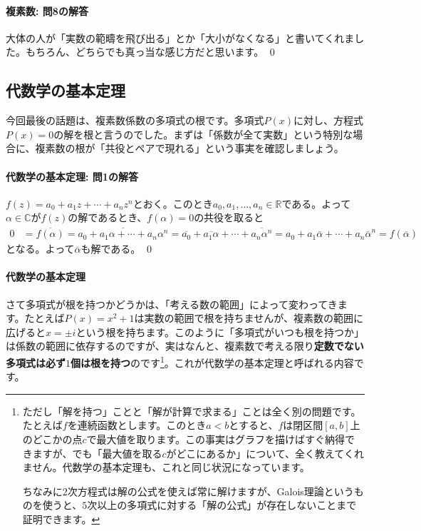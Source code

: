 \paragraph{複素数: 問8の解答}

大体の人が「実数の範疇を飛び出る」とか「大小がなくなる」と書いてくれました。もちろん、どちらでも真っ当な感じ方だと思います。 \qed

\subsection{代数学の基本定理}

今回最後の話題は、複素数係数の多項式の根です。多項式$P(x)$に対し、方程式$P(x)=0$の解を根と言うのでした。まずは「係数が全て実数」という特別な場合に、複素数の根が「共役とペアで現れる」という事実を確認しましょう。

\paragraph{代数学の基本定理: 問1の解答}

$f(z) = a_0 + a_1 z + \cdots + a_n z^n$とおく。このとき$a_0,a_1,\ldots,a_n\in\mathbb{R}$である。よって$\alpha\in\mathbb{C}$が$f(z)$の解であるとき、$f(\alpha)=0$の共役を取ると
\begin{align*}
0 &= \overline{f(\alpha)}
= \overline{a_0 + a_1 \alpha + \cdots + a_n \alpha^n}
= \overline{a_0} +\overline{a_1 \alpha} + \cdots + \overline{a_n \alpha^n}
= a_0 + a_1 \overline{\alpha} + \cdots + a_n \overline{\alpha}^n
= f(\overline{\alpha})
\end{align*}
となる。よって$\overline{\alpha}$も解である。 \qed

\paragraph{代数学の基本定理}

さて多項式が根を持つかどうかは、「考える数の範囲」によって変わってきます。たとえば$P(x)=x^2+1$は実数の範囲で根を持ちませんが、複素数の範囲に広げると$x=\pm i$という根を持ちます。このように「多項式がいつも根を持つか」は係数の範囲に依存するのですが、実はなんと、複素数で考える限り\textbf{定数でない多項式は必ず$1$個は根を持つ}のです\footnote{ただし「解を持つ」ことと「解が計算で求まる」ことは全く別の問題です。たとえば$f$を連続函数とします。このとき$a<b$とすると、$f$は閉区間$[a,b]$上のどこかの点$c$で最大値を取ります。この事実はグラフを描けばすぐ納得できますが、でも「最大値を取る$c$がどこにあるか」について、全く教えてくれません。代数学の基本定理も、これと同じ状況になっています。

ちなみに$2$次方程式は解の公式を使えば常に解けますが、Galois理論というものを使うと、$5$次以上の多項式に対する「解の公式」が存在しないことまで証明できます。}。これが代数学の基本定理と呼ばれる内容です。

